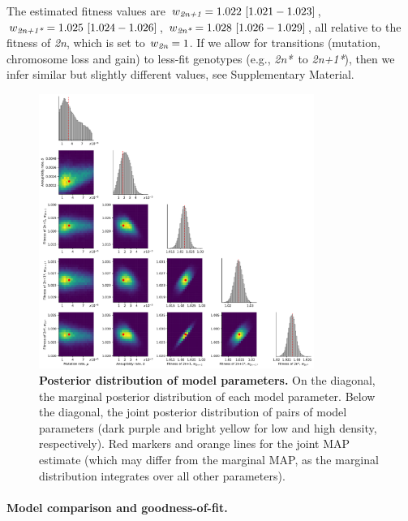 \documentclass[12pt]{extarticle}
\newcommand{\euwt}{\emph{2n}}
\newcommand{\anwt}{\emph{2n+1}}
\newcommand{\eumt}{\emph{2n*}}
\newcommand{\anmt}{\emph{2n+1*}}
\begin{document}
The estimated fitness values are $w_{\anwt}=1.022\ [1.021-1.023]$,
$w_{\anmt}=1.025\ [1.024-1.026]$,
$w_{\eumt}=1.028\ [1.026-1.029]$, all relative to the fitness of \euwt, which is set to $w_{\euwt}=1$. 
If we allow for transitions (mutation, chromosome loss and gain) to less-fit genotypes (e.g., \eumt\ to \anmt), then we infer similar but slightly different values, see Supplementary Material.

\begin{figure}[h]
  \centering
\includegraphics[width=0.8\textwidth]{../figures/posterior.pdf}
  \caption{
  \textbf{Posterior distribution of model parameters.}
On the diagonal, the marginal posterior distribution of each model parameter. 
Below the diagonal, the joint posterior distribution of pairs of model parameters (dark purple and bright yellow for low and high density, respectively). Red markers and orange lines for the joint MAP estimate (which may differ from the marginal MAP, as the marginal distribution integrates over all other parameters).
} 
  \label{fig:posterior}
\end{figure}

\paragraph{Model comparison and goodness-of-fit.}
\end{document}
